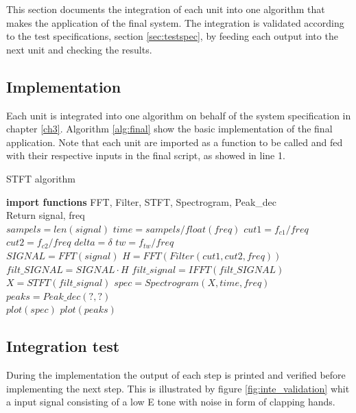 This section documents the integration of each unit into one algorithm that makes the application of the final system. The integration is validated according to the test specifications, section \ref{sec:testspec}, by feeding each output into the next unit and checking the results. 

\subsection{Implementation}
Each unit is integrated into one algorithm on behalf of the system specification in chapter \ref{ch3}. Algorithm \ref{alg:final} show the basic implementation of the final application. Note that each unit are imported as a function to be called and fed with their respective inputs in the final script, as showed in line 1.
\begin{algorithm}[H]
\caption{STFT algorithm}
\label{STFTalg}
\begin{algorithmic}[1]
\State \textbf{import functions} FFT, Filter, STFT, Spectrogram, Peak\_dec  
\\
\State Return signal, freq 
\EndProcedure 
\\
\State $sampels = len(signal)$ 
\State $time   = sampels/float(freq)$
\State $cut1 = f_{c1}/freq$ 
\State $cut2 = f_{c2}/freq$
\State $delta = \delta$
\State $tw = f_{tw}/freq$
\\
\State $SIGNAL = FFT(signal) $
\State $H = FFT(Filter(cut1,cut2,freq))$
\State $filt\_SIGNAL = SIGNAL \cdot H$
\State $filt\_signal = IFFT(filt\_SIGNAL)$  
\EndProcedure 
\\
\State $X = STFT(filt\_signal)$
\State $spec = Spectrogram(X,time,freq)$
\State $peaks = Peak\_dec(?,?)$
\EndProcedure
\\
\State $plot(spec)$ 
\State $plot(peaks)$
\EndProcedure
\end{algorithmic}
\label{alg:final}
\end{algorithm}      

\subsection{Integration test}
During the implementation the output of each step is printed and verified before implementing the next step. This is illustrated by figure \ref{fig:inte_validation} whit a input signal consisting of a low E tone with noise in form of clapping hands.  

